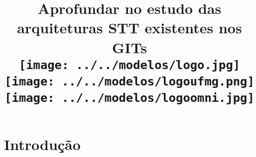 \documentclass{article}
\author{}
\begin{document}
\begin{titlepage}

	\title{
    \vspace{8cm}
		\textbf{Aprofundar no estudo das arquiteturas STT existentes nos GITs} \\
		\vspace{0.2in}
		\vspace*{0.8in}
		\hspace*{0.5in}
    \texttt{[image: ../../modelos/logo.jpg]}
		\hspace*{0.5in}
    \texttt{[image: ../../modelos/logoufmg.png]}
		\hspace*{0.5in}
    \texttt{[image: ../../modelos/logoomni.jpg]}\\
	}
\end{titlepage}

\date{}
\maketitle
\pagebreak

\tableofcontents
\pagebreak

\section{Introdução}


\newpage


\end{document}
